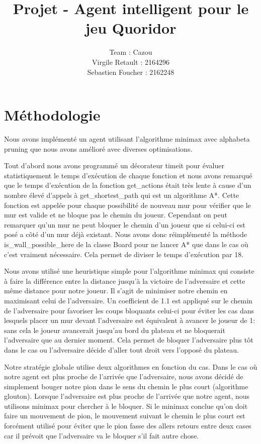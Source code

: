 \documentclass[12pt]{article}
\title{Projet - Agent intelligent pour le jeu Quoridor}
\author{
  Team : Cazou\\
  Virgile Retault : 2164296\\
  Sebastien Foucher : 2162248
}
\begin{document}
\maketitle

\section*{Méthodologie}

Nous avons implémenté un agent utilisant l'algorithme minimax avec alphabeta pruning que nous avons amélioré avec diverses optimisations.

Tout d'abord nous avons programmé un décorateur timeit pour évaluer statistiquement le temps d'exécution de chaque fonction et nous avons remarqué que le temps d'exécution de la fonction get\_actions était très lente à cause d'un nombre élevé d'appels à get\_shortest\_path qui est un algorithme A*. Cette fonction est appelée pour chaque possibilité de nouveau mur pour vérifier que le mur est valide et ne bloque pas le chemin du joueur. Cependant on peut remarquer qu'un mur ne peut bloquer le chemin d'un joueur que si celui-ci est posé a côté d'un mur déjà existant. Nous avons donc réimplémenté la méthode is\_wall\_possible\_here de la classe Board pour ne lancer A* que dans le cas où c'est vraiment nécessaire. Cela permet de diviser le temps d'exécution par 18. 

Nous avons utilisé une heuristique simple pour l'algorithme minimax qui consiste à faire la différence entre la distance jusqu'à la victoire de l'adversaire et cette même distance pour notre joueur. Il s'agit de minimiser notre chemin en maximisant celui de l'adversaire. Un coefficient de 1.1 est appliqué sur le chemin de l'adversaire pour favoriser les coups bloquants celui-ci pour éviter les cas dans lesquels placer un mur devant l'adversaire est équivalent à avancer le joueur de 1: sans cela le joueur avancerait jusqu'au bord du plateau et ne bloquerait l'adversaire que au dernier moment. Cela permet de bloquer l'adversaire plus tôt dans le cas ou l'adversaire décide d'aller tout droit vers l'opposé du plateau. 

Notre stratégie globale utilise deux algorithmes en fonction du cas. Dans le cas où notre agent est plus proche de l'arrivée que l'adversaire, nous avons décidé de simplement bouger notre pion dans le sens du chemin le plus court (algorithme glouton). Lorsque l'adversaire est plus proche de l'arrivée que notre agent, nous utilisons minimax pour chercher à le bloquer. Si le minimax conclue qu'on doit faire un mouvement de pion, le mouvement suivant le chemin le plus court est forcément utilisé pour éviter que le pion fasse des allers retours entre deux cases car il prévoit que l'adversaire va le bloquer s'il fait autre chose. 
\end{document}
